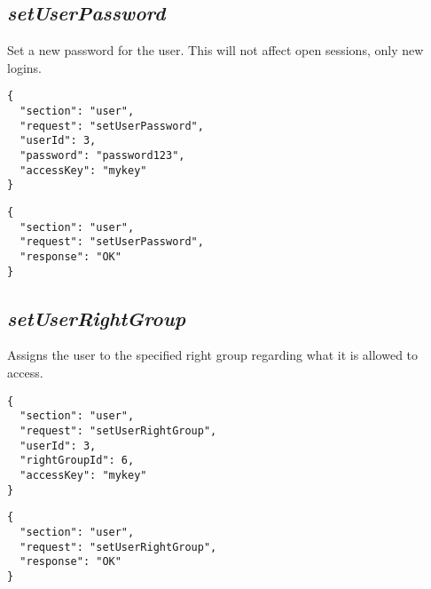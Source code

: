 \subsection*{\textit{setUserPassword}}
	Set a new password for the user. This will not affect open sessions, only new logins.
	{
		\color{blue}
		\begin{verbatim}
{
  "section": "user",
  "request": "setUserPassword",
  "userId": 3,
  "password": "password123",
  "accessKey": "mykey"
}
		\end{verbatim}
	}
	{
		\color{OliveGreen}
		\begin{verbatim}
{
  "section": "user",
  "request": "setUserPassword",
  "response": "OK"
}
		\end{verbatim}
	}
\subsection*{\textit{setUserRightGroup}}
	Assigns the user to the specified right group regarding what it is allowed to access.
	{
		\color{blue}
		\begin{verbatim}
{
  "section": "user",
  "request": "setUserRightGroup",
  "userId": 3,
  "rightGroupId": 6,
  "accessKey": "mykey"
}
		\end{verbatim}
	}
	{
		\color{OliveGreen}
		\begin{verbatim}
{
  "section": "user",
  "request": "setUserRightGroup",
  "response": "OK"
}
		\end{verbatim}
	}



